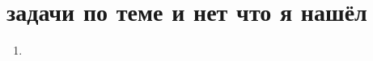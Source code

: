 \documentclass[a4paper,10pt]{article}
\begin{document}
\section*{задачи по теме и нет что я нашёл}
\begin{enumerate}
    \item 
\end{enumerate}
\end{document}
